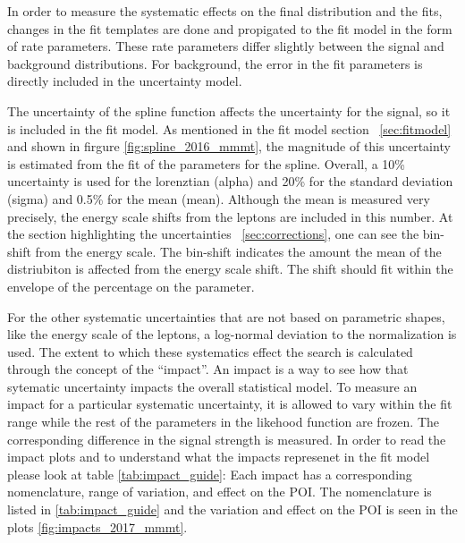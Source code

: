 In order to measure the systematic effects on the final distribution and the fits, changes in the fit templates are done and propigated to the fit model in the form of rate parameters. These rate parameters differ slightly between the signal and background distributions. 
For background, the error in the fit parameters is directly included in the uncertainty model. 

The uncertainty of the spline function affects the uncertainty for the signal, so it is included in the fit model. 
As mentioned in the fit model section ~\ref{sec:fitmodel} and shown in firgure \ref{fig:spline_2016_mmmt}, the magnitude of this uncertainty is estimated from the fit of the parameters for the spline. Overall, a 10\% uncertainty is used for the lorenztian (alpha) and 20\% for the standard deviation (sigma) and 0.5\% for the mean (mean). Although the mean is measured very precisely, the energy scale shifts from the leptons are included in this number. At the section highlighting the uncertainties ~\ref{sec:corrections}, one can see the bin-shift from the energy scale. The bin-shift indicates the amount the mean of the distriubiton is affected from the energy scale shift. The shift should fit within the envelope of the percentage on the parameter. 


For the other systematic uncertainties that are not based on parametric shapes, like the energy scale of the leptons, a log-normal deviation to the normalization is used. 
The extent to which these systematics effect the search is calculated through the concept of the ``impact''. An impact is a way to see how that sytematic uncertainty impacts the overall statistical model. To measure an impact for a particular systematic uncertainty, it is allowed to vary within the fit range while the rest of the parameters in the likehood function are frozen. The corresponding difference in the signal strength is measured. 
In order to read the impact plots and to understand what the impacts represenet in the fit model please look at table \ref{tab:impact_guide}:
Each impact has a corresponding nomenclature, range of variation, and effect on the POI. The nomenclature is listed in \ref{tab:impact_guide} and the variation and effect on the POI is seen in the plots \ref{fig:impacts_2017_mmmt}.

